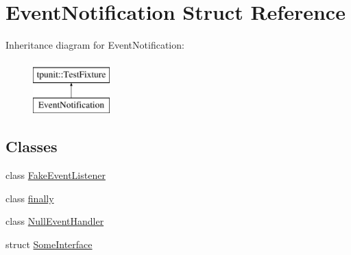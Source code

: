 \hypertarget{structEventNotification}{}\section{Event\+Notification Struct Reference}
\label{structEventNotification}
Inheritance diagram for Event\+Notification\+:\begin{figure}[H]
\begin{center}
\leavevmode
\includegraphics[height=2.000000cm]{structEventNotification}
\end{center}
\end{figure}
\subsection*{Classes}
\begin{DoxyCompactItemize}
\item 
class \mbox{\hyperlink{classEventNotification_1_1FakeEventListener}{Fake\+Event\+Listener}}
\item 
class \mbox{\hyperlink{classEventNotification_1_1finally}{finally}}
\item 
class \mbox{\hyperlink{classEventNotification_1_1NullEventHandler}{Null\+Event\+Handler}}
\item 
struct \mbox{\hyperlink{structEventNotification_1_1SomeInterface}{Some\+Interface}}
\end{DoxyCompactItemize}
